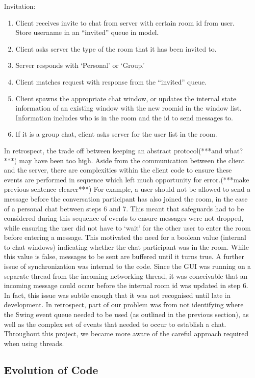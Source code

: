 Invitation:
\begin{enumerate}
\item Client receives invite to chat from server with certain room id from user. Store username in an ``invited'' queue in model.  
\item Client asks server the type of the room that it has been invited to.
\item Server responds with `Personal' or `Group.'
\item Client matches request with response from the ``invited'' queue.
\item Client spawns the appropriate chat window, or updates the internal state information of an existing window with the new roomid in the window list. Information includes who is in the room and the id to send messages to.
\item If it is a group chat, client asks server for the user list in the room.
\end{enumerate}

In retrospect, the trade off between keeping an abstract protocol(***and what?***) may have been too high. Aside from the communication between the client and the server, there are complexities within the client code to ensure these events are performed in sequence which left much opportunity for error.(***make previous sentence clearer***) For example, a user should not be allowed to send a message before the conversation participant has also joined the room, in the case of a personal chat between steps 6 and 7. This meant that safeguards had to be considered during this sequence of events to ensure messages were not dropped, while ensuring the user did not have to `wait' for the other user to enter the room before entering a message. This motivated the need for a boolean value (internal to chat windows) indicating whether the chat participant was in the room. While this value is false, messages to be sent are buffered until it turns true. A further issue of synchronization was internal to the code. Since the GUI was running on a separate thread from the incoming networking thread, it was conceivable that an incoming message could occur before the internal room id was updated in step 6. In fact, this issue was subtle enough that it was not recognised until late in development. In retrospect, part of our problem was from not identifying where the Swing event queue needed to be used (as outlined in the previous section), as well as the complex set of events that needed to occur to establish a chat. Throughout this project, we became more aware of the careful approach required when using threads.

\subsection{Evolution of Code}
